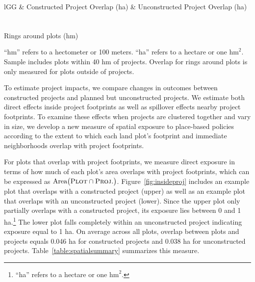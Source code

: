 \documentclass[12pt]{article}
\newcommand{\haref}{
	``ha'' refers to a hectare or one $\text{hm}^{2}$.
}
\newcommand{\hmrefha}{
	``hm'' refers to a hectometer or 100 meters. ``ha'' refers to a hectare or one $\text{hm}^{2}$.
}
\begin{document}
\begin{table}
\small
\centering
\caption{Spatial Exposure Summary Statistics}\label{table:spatialsummary}
\vspace{-2mm}
\begin{threeparttable}
\begin{tabular}{lGG}
\toprule
& Constructed Project Overlap (ha) & Unconstructed  Project Overlap (ha) \\
\midrule
\\[-.7em]

\\[-.5em]
\hspace{2em}Rings around plots (hm)   \\

\bottomrule
\end{tabular}
\begin{tablenotes}
\item \footnotesize \hmrefha Sample includes plots within 40 hm of projects.  Overlap for rings around plots is only measured for plots outside of projects.
\end{tablenotes}
\end{threeparttable}
\end{table}



To estimate project impacts, we compare changes in outcomes between constructed projects and planned but unconstructed projects.  We estimate both direct effects inside project footprints as well as spillover effects nearby project footprints.  To examine these effects when projects are clustered together and vary in size, we develop a new measure of spatial exposure to place-based policies according to the extent to which each land plot's footprint and immediate neighborhoods overlap with project footprints.  

For plots that overlap with project footprints, we measure direct exposure in terms of how much of each plot's area overlaps with project footprints, which can be expressed as $\text{Area}\big(\textsc{Plot}  \cap  \textsc{Proj.}\big)$.  Figure~\ref{fig:insideproj} includes an example plot that overlaps with a constructed project (upper) as well as an example plot that overlaps with an unconstructed project (lower).  Since the upper plot only partially overlaps with a constructed project, its exposure lies between 0 and 1 ha.\footnote{\haref}  The lower plot falls completely within an unconstructed project indicating exposure equal to 1 ha.  On average across all plots, overlap between plots and projects equals 0.046 ha for constructed projects and 0.038 ha for unconstructed projects. Table~\ref{table:spatialsummary} summarizes this measure.
\end{document}
